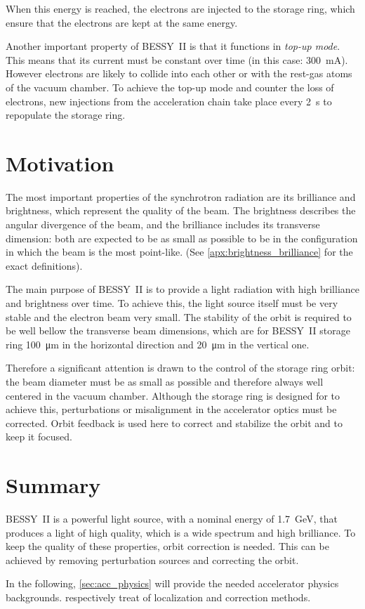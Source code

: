 When this energy is reached, the electrons are injected to the storage ring, which ensure that the electrons are kept at the same energy.

Another important property of BESSY~II is that it functions in \textit{top-up mode}. This means that its current must be constant over time (in this case: \SI{300}{\milli\ampere}). However electrons are likely to collide into each other or with the rest-gas atoms of the vacuum chamber. To achieve the top-up mode and counter the loss of electrons, new injections from the acceleration chain take place every 2~s to repopulate the storage ring.

\section{Motivation}
The most important properties of the synchrotron radiation are its brilliance and brightness, which represent the quality of the beam. The brightness describes the angular divergence of the beam, and the brilliance includes its transverse dimension: both are expected to be as small as possible to be in the configuration in which the beam is the most point-like. (See \cref{apx:brightness_brilliance} for the exact definitions).

The main purpose of BESSY~II is to provide a light radiation with high brilliance and brightness over time. To achieve this, the light source itself must be very stable and the electron beam very small. The stability of the orbit is required to be well bellow the transverse beam dimensions, which are for BESSY~II storage ring \SI{100}{\micro\meter} in the horizontal direction and \SI{20}{\micro\meter} in the vertical one. 

Therefore a significant attention is drawn to the control of the storage ring orbit: the beam diameter must be as small as possible and therefore always well centered in the vacuum chamber. Although the storage ring is designed for to achieve this, perturbations or misalignment in the accelerator optics must be corrected. Orbit feedback is used here to correct and stabilize the orbit and to keep it focused.

\section{Summary}
BESSY~II is a powerful light source, with a nominal energy of \SI{1.7}{\giga\electronvolt}, that produces a light of high quality, which is a wide spectrum and high brilliance. To keep the quality of these properties, orbit correction is needed. This can be achieved by removing perturbation sources and correcting the orbit.

In the following, \cref{sec:acc_physics} will provide the needed accelerator physics backgrounds.  respectively treat of localization and correction methods.
